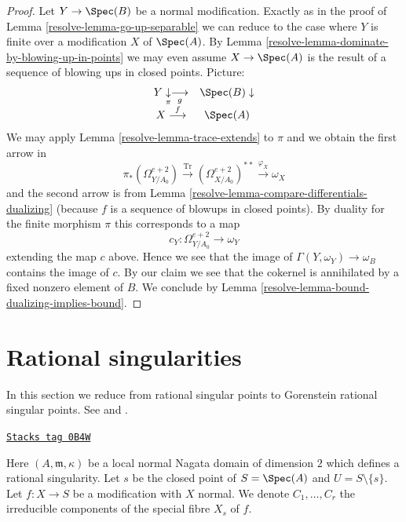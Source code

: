 \begin{proof}
\medskip\noindent
Let $Y \to \Spec(B)$ be a normal modification. Exactly as in the proof of
Lemma \ref{resolve-lemma-go-up-separable} we can reduce to the case where $Y$
is finite over a modification $X$ of $\Spec(A)$. By
Lemma \ref{resolve-lemma-dominate-by-blowing-up-in-points} we may
even assume $X \to \Spec(A)$ is the result of a sequence of
blowing ups in closed points. Picture:
$$
\begin{array}{cc}Y \underset{\pi}{\downarrow}\underset{g}{\longrightarrow} & \Spec(B) \downarrow \\ X \overset{f}{\longrightarrow} & \Spec(A)\end{array}
$$
We may apply Lemma \ref{resolve-lemma-trace-extends} to $\pi$ and
we obtain the first arrow in
$$
\pi_*(\Omega^{e + 2}_{Y/A_0})
\xrightarrow{\text{Tr}}
(\Omega^{e + 2}_{X/A_0})^{**}
\xrightarrow{\varphi_X}
\omega_X
$$
and the second arrow is from
Lemma \ref{resolve-lemma-compare-differentials-dualizing}
(because $f$ is a sequence of blowups in closed points).
By duality for the finite morphism $\pi$ this corresponds to a map
$$
c_Y : \Omega^{e + 2}_{Y/A_0} \longrightarrow \omega_Y
$$
extending the map $c$ above. Hence we see that the image of
$\Gamma(Y, \omega_Y) \to \omega_B$ contains the image of $c$.
By our claim we see that the cokernel is annihilated by
a fixed nonzero element of $B$. We conclude by
Lemma \ref{resolve-lemma-bound-dualizing-implies-bound}.
\end{proof}

\section{Rational singularities}
\label{resolve-section-rational-singularities}
In this section we reduce from rational singular points to
Gorenstein rational singular points. See \cite{Lipman-rational} and
\cite{Mattuck}.

\begin{definition}
\label{resolve-situation-rational}
\href{https://stacks.math.columbia.edu/tag/0B4W}{\texttt{Stacks tag 0B4W}}

Here $(A, \mathfrak m, \kappa)$ be a local normal Nagata domain of
dimension $2$ which defines a rational singularity. Let $s$ be the closed
point of $S = \Spec(A)$ and $U = S \setminus \{s\}$. Let $f : X \to S$
be a modification with $X$ normal.
We denote $C_1, \ldots, C_r$ the irreducible
components of the special fibre $X_s$ of $f$.
\end{definition}

